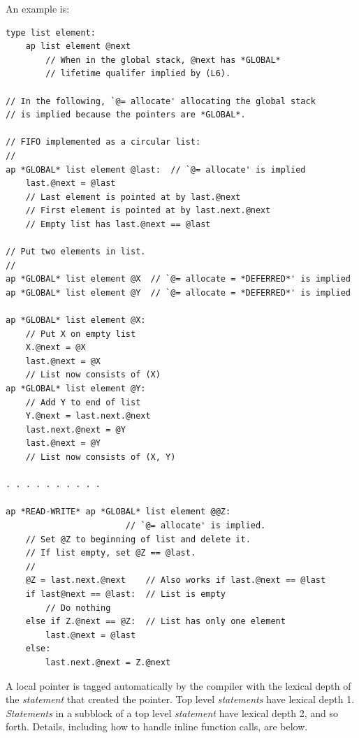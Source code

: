 \documentclass[12pt]{article}
\newenvironment{indpar}[1][0.3in]%
	{\begin{list}{}%
		     {\setlength{\itemsep}{0in}%
		      \setlength{\topsep}{0in}%
		      \setlength{\parsep}{1ex}%
		      \setlength{\labelwidth}{#1}%
		      \setlength{\leftmargin}{#1}%
		      \addtolength{\leftmargin}{\labelsep}}%
	 \item}%
	{\end{list}}
\begin{document}
An example is:
\begin{indpar}\begin{verbatim}
type list element:
    ap list element @next
        // When in the global stack, @next has *GLOBAL*
        // lifetime qualifer implied by (L6).

// In the following, `@= allocate' allocating the global stack
// is implied because the pointers are *GLOBAL*.

// FIFO implemented as a circular list:
//
ap *GLOBAL* list element @last:  // `@= allocate' is implied
    last.@next = @last
    // Last element is pointed at by last.@next
    // First element is pointed at by last.next.@next
    // Empty list has last.@next == @last

// Put two elements in list.
//
ap *GLOBAL* list element @X  // `@= allocate = *DEFERRED*' is implied
ap *GLOBAL* list element @Y  // `@= allocate = *DEFERRED*' is implied

ap *GLOBAL* list element @X:
    // Put X on empty list
    X.@next = @X
    last.@next = @X
    // List now consists of (X)
ap *GLOBAL* list element @Y:
    // Add Y to end of list
    Y.@next = last.next.@next
    last.next.@next = @Y
    last.@next = @Y
    // List now consists of (X, Y)

. . . . . . . . . .

ap *READ-WRITE* ap *GLOBAL* list element @@Z:
                        // `@= allocate' is implied.
    // Set @Z to beginning of list and delete it.
    // If list empty, set @Z == @last.
    //
    @Z = last.next.@next    // Also works if last.@next == @last
    if last@next == @last:  // List is empty
        // Do nothing
    else if Z.@next == @Z:  // List has only one element
        last.@next = @last
    else:
        last.next.@next = Z.@next
\end{verbatim}\end{indpar}

A local pointer is tagged automatically by the compiler with the
lexical depth of the {\em statement} that created the pointer.  Top level
{\em statements} have lexical depth 1.  {\em Statements} in a subblock
of a top level {\em statement} have lexical depth 2, and so forth.
Details, including how to handle inline function calls, are below.
\end{document}
